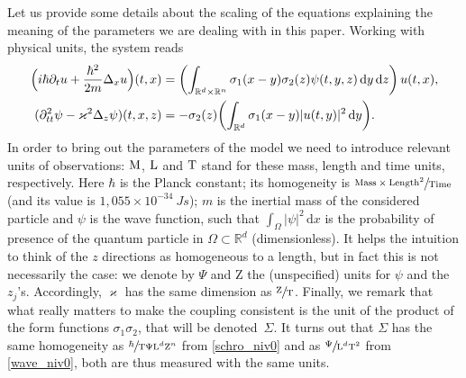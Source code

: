 \documentclass[JEP,XML,SOM,NoEqCountersInSection,NoFloatCountersInSection,Unicode,published]{cedram}
\theoremstyle{definition}
\newcommand{\ud}{\, {\mathrm{d}}}
\begin{document}
Let us provide some details about the scaling of the equations
explaining the meaning of the parameters we are dealing with in this paper. Working with physical units, the system reads
\begin{subequations}
\begin{align}
\label{schro_niv0}
\Bigl(i\hbar \partial_{t}u+\frac{\hbar ^2}{2m}\Delta_{x}u\Bigr)(t,x)&=\left(\int_{\mathbb R^d\times\mathbb R^n}
\sigma_{1}(x-y) \sigma_{2}(z)\psi(t,y,z)\ud y\ud z\right)u(t,x),\\
\label{wave_niv0}(\partial_{tt}^{2}\psi-\varkappa^{2}\Delta_{z}\psi)(t,x,z)&=-\sigma_{2}(z)\biggl(\int_{\mathbb R^d} \sigma_{1}(x-y)|u(t,y)|^{2}
\ud y\biggr).
\end{align}
\end{subequations}
In order to bring out the parameters of the model we need to introduce relevant units of observations: $\textup M$, $\textup L$ and $\textup T$
stand for these mass, length and time units, respectively.
Here $\hbar $ is the Planck constant; its homogeneity is $\sfrac{\textup{Mass}\times \textup{Length}^2}{ \textup{Time}}$ (and its value is $1,055 \times10^{-34}\ J s$); $m$ is the inertial mass of the considered particle and $\psi$ is the wave function, such that $\int_\Omega |\psi|^2\ud x$ is
the probability of presence of the quantum particle in $\Omega\subset \mathbb R^d$ (dimensionless).
It helps the intuition to think of the $z$ directions as homogeneous to a length, but in fact this is not necessarily the case: we denote by $\Psi$ and $\mathrm Z$ the (unspecified) units for $\psi$ and the $z_j$'s. Accordingly, $\varkappa$ has the same dimension as $\sfrac{\mathrm Z}{\mathrm T}$.
Finally, we remark that what really matters to make the coupling consistent is the unit of the product of the form functions $\sigma_1\sigma_2$, that will be denoted~$\Sigma$. It turns out that $\Sigma $ has the same homogeneity
as
$\sfrac{\hbar }{ \mathrm T \Psi\mathrm L^d\mathrm Z^n}$
from \eqref{schro_niv0}
and
as $\sfrac{ \Psi}{\mathrm L^d \mathrm T^2}$
from \eqref{wave_niv0}, both are thus measured with the same units.
\end{document}

